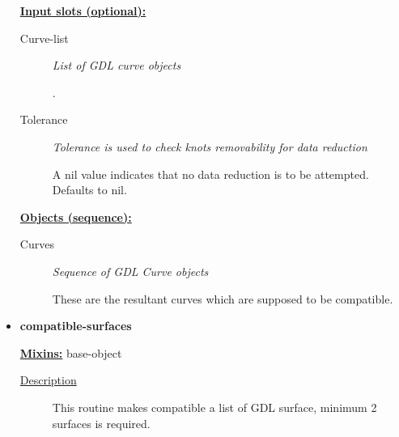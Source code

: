 \documentclass [11pt]{book}
\begin{document}
\begin{itemize}
\begin{figure}
\end{figure}





\textbf{
\underline{Input slots (optional):}}

\begin{description}

\item [Curve-list]
\emph{List of GDL curve objects}

.




\item [Tolerance]
\emph{Tolerance is used to check knots removability for data reduction}

 A nil value indicates that no data reduction
is to be attempted. Defaults to nil.




\end{description}






\textbf{
\underline{Objects (sequence):}}

\begin{description}

\item [Curves]
\emph{Sequence of GDL Curve objects}

 These are the resultant curves which
are supposed to be compatible.




\end{description}







\item {}
\label{prim:compatible-surfaces}
\textbf{compatible-surfaces}


\textbf{
\underline{Mixins:}} base-object





\begin{description}

\item [
\underline{Description}]


This routine makes compatible a list of GDL surface, minimum 2 surfaces is required.




\end{description}
\end{itemize}
\end{document}
